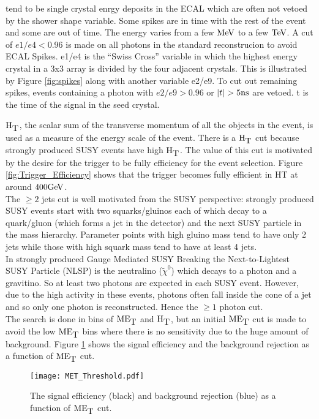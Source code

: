 \begin{itemize}
tend to be single crystal enrgy deposits in the ECAL which are often not vetoed 
by the shower shape variable. Some spikes are in time with the rest of the event 
and some are out of time. The energy varies from a few $\mbox{MeV}$ to a few $\mbox{TeV}$. A 
cut of $e1/e4 < 0.96$ is made on all photons in the standard reconstrucion to 
avoid ECAL Spikes. e1/e4 is the ``Swiss Cross'' variable in which the highest
energy crystal in a 3x3 array is divided by the four adjacent crystals. This is
illustrated by Figure \ref{fig:spikes} along with another variable e2/e9. To cut 
out remaining spikes, events containing a photon with $e2/e9 > 0.96$ or $|t| > 
5\mbox{ns}$ are vetoed. t is the time of the signal in the seed crystal.
\end{itemize}

$\mbox{H}_{\mbox{T}}$, the scalar sum of the transverse momentum of all the objects in the 
event, is used as a measure of the energy scale of the event. There is a $\mbox{H}_{\mbox{T}}$ 
cut because strongly produced SUSY events have high $\mbox{H}_{\mbox{T}}$. The value of this cut
is motivated by the desire for the trigger to be fully efficiency for the event
selection. Figure \ref{fig:Trigger_Efficiency} shows that the trigger becomes
fully efficient in HT at around $400\mbox{GeV}$. \\

The $\geq 2$ jets cut is well motivated from the SUSY perspective: strongly
produced SUSY events start with two squarks/gluinos each of which decay to a 
quark/gluon (which forms a jet in the detector) and the next SUSY particle in 
the mass hierarchy. Parameter points with high gluino mass tend to have only 2 
jets while those with high squark mass tend to have at least 4 jets. \\

In strongly produced Gauge Mediated SUSY Breaking the Next-to-Lightest SUSY 
Particle (NLSP) is the neutralino ($\tilde{\chi}^{0}$) which decays to a photon and 
a gravitino. So at least two photons are expected in each SUSY event. However, 
due to the high activity in these events, photons often fall inside the cone of
a jet and so only one photon is reconstructed. Hence the $\geq 1$ photon cut. \\

The search is done in bins of $\mbox{ME}_{\mbox{T}}$ and $\mbox{H}_{\mbox{T}}$, but an initial $\mbox{ME}_{\mbox{T}}$ cut is
made to avoid the low $\mbox{ME}_{\mbox{T}}$ bins where there is no sensitivity due to the huge
amount of background. Figure \ref{fig:met_threshold} shows the signal efficiency
and the background rejection as a function of $\mbox{ME}_{\mbox{T}}$ cut.

\begin{figure}
\begin{center}
\texttt{[image: MET\_Threshold.pdf]}
\end{center}
\caption{The signal efficiency (black) and background rejection (blue) as a
function of $\mbox{ME}_{\mbox{T}}$ cut.}
\label{fig:met_threshold}
\end{figure}
